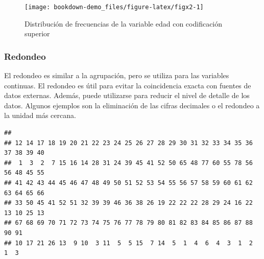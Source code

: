 \documentclass[]{book}
\newenvironment{Shaded}{\begin{snugshade}}{\end{snugshade}}
\newcommand{\CommentTok}[1]{\textcolor[rgb]{0.56,0.35,0.01}{\textit{#1}}}
\newcommand{\DecValTok}[1]{\textcolor[rgb]{0.00,0.00,0.81}{#1}}
\newcommand{\KeywordTok}[1]{\textcolor[rgb]{0.13,0.29,0.53}{\textbf{#1}}}
\newcommand{\NormalTok}[1]{#1}
\newcommand{\OperatorTok}[1]{\textcolor[rgb]{0.81,0.36,0.00}{\textbf{#1}}}
\newcommand{\StringTok}[1]{\textcolor[rgb]{0.31,0.60,0.02}{#1}}
\theoremstyle{definition}
\theoremstyle{definition}
\theoremstyle{definition}
\theoremstyle{definition}
\theoremstyle{remark}
\begin{document}
\begin{figure}
\texttt{[image: bookdown-demo\_files/figure-latex/figx2-1]} \caption{Distribución de frecuencias de la variable edad con codificación superior}\label{fig:figx2}
\end{figure}

\hypertarget{redondeo}{%
\subsubsection{Redondeo}\label{redondeo}}

El redondeo es similar a la agrupación, pero se utiliza para las variables continuas. El redondeo es útil para evitar la coincidencia exacta con fuentes de datos externas. Además, puede utilizarse para reducir el nivel de detalle de los datos. Algunos ejemplos son la eliminación de las cifras decimales o el redondeo a la unidad más cercana.

\begin{Shaded}
\end{Shaded}

\begin{verbatim}
## 
## 12 14 17 18 19 20 21 22 23 24 25 26 27 28 29 30 31 32 33 34 35 36 37 38 39 40 
##  1  3  2  7 15 16 14 28 31 24 39 45 41 52 50 65 48 77 60 55 78 56 56 48 45 55 
## 41 42 43 44 45 46 47 48 49 50 51 52 53 54 55 56 57 58 59 60 61 62 63 64 65 66 
## 33 50 45 41 52 51 32 39 39 46 36 38 26 19 22 22 22 28 29 24 16 22 13 10 25 13 
## 67 68 69 70 71 72 73 74 75 76 77 78 79 80 81 82 83 84 85 86 87 88 90 91 
## 10 17 21 26 13  9 10  3 11  5  5 15  7 14  5  1  4  6  4  3  1  2  1  3
\end{verbatim}

\begin{Shaded}
\end{Shaded}
\end{document}
